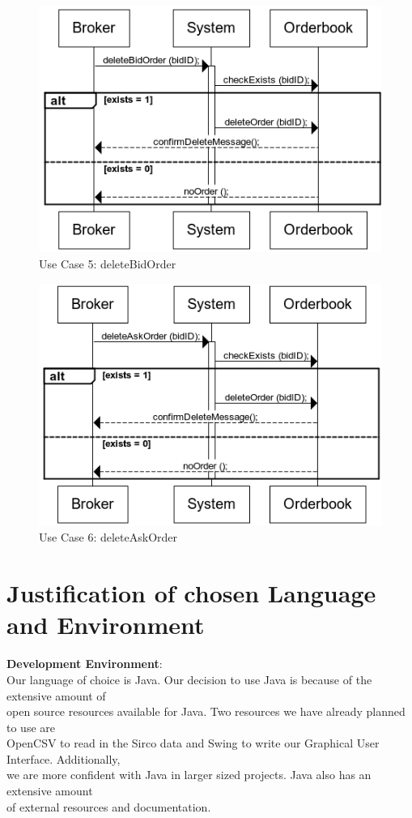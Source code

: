 \documentclass[a4paper]{article}
\begin{document}
\begin{figure}[H]
   \includegraphics[width=1\textwidth]{images/deleteBidOrder}
   \caption{Use Case 5: deleteBidOrder}
\end{figure}

\begin{figure}[H]
   \includegraphics[width=1\textwidth]{images/deleteAskOrder}
   \caption{Use Case 6: deleteAskOrder}
\end{figure}

\section {Justification of chosen Language and Environment}

{\bf Development Environment}: \\
\indent Our language of choice is Java. Our decision to use Java is because of the extensive amount of \\ 
open source resources available for Java. Two resources we have already planned to use are \\
OpenCSV to read in the Sirco data and Swing to write our Graphical User Interface. Additionally, \\
we are more confident with Java in larger sized projects. Java also has an extensive amount  \\
of external resources and documentation. \\
\end{document}
